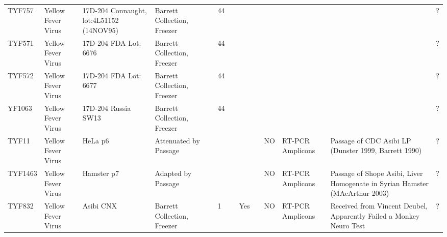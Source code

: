 \begin{longtable}{@{}lllllllllllll@{}}
TYF757         & Yellow Fever Virus & 17D-204 Connaught, lot:4L51152 (14NOV95)  & Barrett Collection, Freezer            &             & 44                      &                       &           &          &                             &                    &                                                                                                  & ?                          \\
TYF571         & Yellow Fever Virus & 17D-204 FDA Lot: 6676                     & Barrett Collection, Freezer            &             & 44                      &                       &           &          &                             &                    &                                                                                                  & ?                          \\
TYF572         & Yellow Fever Virus & 17D-204 FDA Lot: 6677                     & Barrett Collection, Freezer            &             & 44                      &                       &           &          &                             &                    &                                                                                                  & ?                          \\
YF1063         & Yellow Fever Virus & 17D-204 Russia SW13                       & Barrett Collection, Freezer            &             & 44                      &                       &           &          &                             &                    &                                                                                                  & ?                          \\
TYF11          & Yellow Fever Virus & HeLa p6                                   & Attenuated by Passage                  &             &                         &                       &           &          & NO                          & RT-PCR Amplicons   & Passage of CDC Asibi LP (Dunster 1999, Barrett 1990)                                             & ?                          \\
TYF1463        & Yellow Fever Virus & Hamster p7                                & Adapted by Passage                     &             &                         &                       &           &          & NO                          & RT-PCR Amplicons   & Passage of Shope Asibi, Liver Homogenate in Syrian Hamster (MAcArthur 2003)                      & ?                          \\
TYF832         & Yellow Fever Virus & Asibi CNX                                 & Barrett Collection, Freezer            &             & 1                       &                       & Yes       &          & NO                          & RT-PCR Amplicons   & Received from Vincent Deubel, Apparently Failed a Monkey Neuro Test                              & ?                          \\

\end{longtable}
